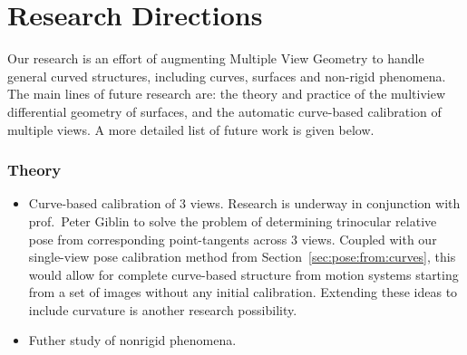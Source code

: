 \mynewpage
\chapter{Research Directions}\label{sec:future:directions}

Our research is an effort of augmenting Multiple View Geometry to
handle general curved structures, including curves, surfaces and non-rigid phenomena.
The main lines of future research are: the theory and
practice of the multiview differential geometry of surfaces, and
the automatic curve-based calibration of multiple views. A more detailed list of
future work is given below.


\subsection{Theory}
\begin{itemize}
\item Curve-based calibration of 3 views. Research is underway in conjunction with prof.\ Peter Giblin to 
solve the problem of determining trinocular relative pose from
corresponding point-tangents across 3 views. Coupled with our single-view
pose calibration method from Section~\ref{sec:pose:from:curves}, this would allow for complete
curve-based structure from motion systems starting from a set of images 
without any initial calibration. Extending these ideas to include
curvature is another research possibility.
\item Futher study of nonrigid phenomena.
\end{itemize}

